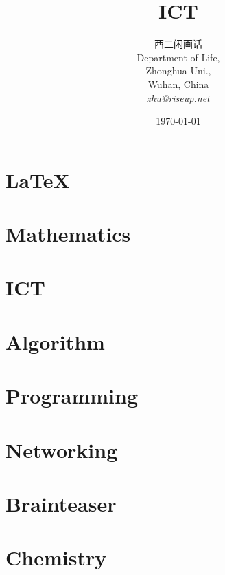 \documentclass[a4paper,11pt]{book}
\begin{document}
\frontmatter{}

\title{ICT}
\author{西二闲画话\\
  Department of Life,\\
  Zhonghua Uni.,\\
  Wuhan, China\\
  \emph{zhu@riseup.net}}
\date{\today}
\maketitle



\setcounter{tocdepth}{3} %
\tableofcontents{}

\mainmatter{}

\part{\LaTeX{}}




\part{Mathematics}



\part{ICT}
\label{part:ict}






\part{Algorithm}




\part{Programming}





\part{Networking}




\part{Brainteaser}



\part{Chemistry}
\label{part:chemistry}


\printbibliography[heading=bibintoc,title={Reference}]{}




\backmatter{}

\end{document}
